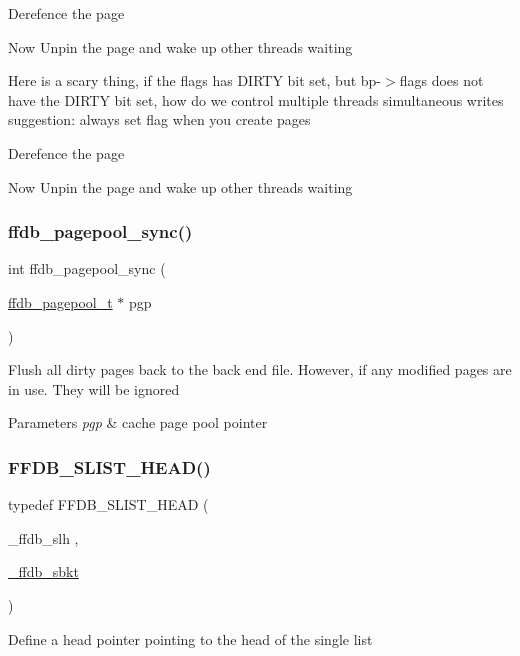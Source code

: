 Derefence the page

Now Unpin the page and wake up other threads waiting

Here is a scary thing, if the flags has D\+I\+R\+TY bit set, but bp-\/$>$flags does not have the D\+I\+R\+TY bit set, how do we control multiple threads simultaneous writes suggestion\+: always set flag when you create pages

Derefence the page

Now Unpin the page and wake up other threads waiting\mbox{\label{adat-devel_2other__libs_2filedb_2filehash_2ffdb__pagepool_8h_ae180f42208c9a87c2b8be32bb3ec93be}} 
\subsubsection{\texorpdfstring{ffdb\_pagepool\_sync()}{ffdb\_pagepool\_sync()}}
{\footnotesize\ttfamily int ffdb\+\_\+pagepool\+\_\+sync (\begin{DoxyParamCaption}\item[{\mbox{\hyperlink{adat-devel_2other__libs_2filedb_2filehash_2ffdb__pagepool_8h_a73290f737b0e5f8be90a0fa96ddf6ab6}{ffdb\+\_\+pagepool\+\_\+t}} $\ast$}]{pgp }\end{DoxyParamCaption})}

Flush all dirty pages back to the back end file. However, if any modified pages are in use. They will be ignored


\begin{DoxyParams}{Parameters}
{\em pgp} & cache page pool pointer \\
\hline
\end{DoxyParams}
\mbox{\label{adat-devel_2other__libs_2filedb_2filehash_2ffdb__pagepool_8h_aad811ff54987678d1dfde499c3ef4899}} 
\subsubsection{\texorpdfstring{FFDB\_SLIST\_HEAD()}{FFDB\_SLIST\_HEAD()}}
{\footnotesize\ttfamily typedef F\+F\+D\+B\+\_\+\+S\+L\+I\+S\+T\+\_\+\+H\+E\+AD (\begin{DoxyParamCaption}\item[{\+\_\+ffdb\+\_\+slh}]{,  }\item[{\mbox{\hyperlink{struct__ffdb__sbkt}{\+\_\+ffdb\+\_\+sbkt}}}]{ }\end{DoxyParamCaption})}

Define a head pointer pointing to the head of the single list 